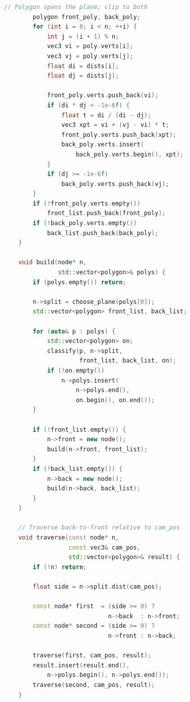 \begin{lstlisting}[language=C++]
        // Polygon spans the plane; clip to both
        polygon front_poly, back_poly;
        for (int i = 0; i < n; ++i) {
            int j = (i + 1) % n;
            vec3 vi = poly.verts[i];
            vec3 vj = poly.verts[j];
            float di = dists[i];
            float dj = dists[j];

            front_poly.verts.push_back(vi);
            if (di * dj < -1e-6f) {
                float t = di / (di - dj);
                vec3 xpt = vi + (vj - vi) * t;
                front_poly.verts.push_back(xpt);
                back_poly.verts.insert(
                    back_poly.verts.begin(), xpt);
            }
            if (dj >= -1e-6f)
                back_poly.verts.push_back(vj);
        }
        if (!front_poly.verts.empty())
            front_list.push_back(front_poly);
        if (!back_poly.verts.empty())
            back_list.push_back(back_poly);
    }

    void build(node* n,
               std::vector<polygon>& polys) {
        if (polys.empty()) return;

        n->split = choose_plane(polys[0]);
        std::vector<polygon> front_list, back_list;

        for (auto& p : polys) {
            std::vector<polygon> on;
            classify(p, n->split,
                     front_list, back_list, on);
            if (!on.empty())
                n->polys.insert(
                    n->polys.end(),
                    on.begin(), on.end());
        }

        if (!front_list.empty()) {
            n->front = new node();
            build(n->front, front_list);
        }
        if (!back_list.empty()) {
            n->back = new node();
            build(n->back, back_list);
        }
    }

    // Traverse back-to-front relative to cam_pos
    void traverse(const node* n,
                  const vec3& cam_pos,
                  std::vector<polygon>& result) {
        if (!n) return;

        float side = n->split.dist(cam_pos);

        const node* first  = (side >= 0) ?
                             n->back  : n->front;
        const node* second = (side >= 0) ?
                             n->front : n->back;

        traverse(first, cam_pos, result);
        result.insert(result.end(),
            n->polys.begin(), n->polys.end());
        traverse(second, cam_pos, result);
    }


\end{lstlisting}
